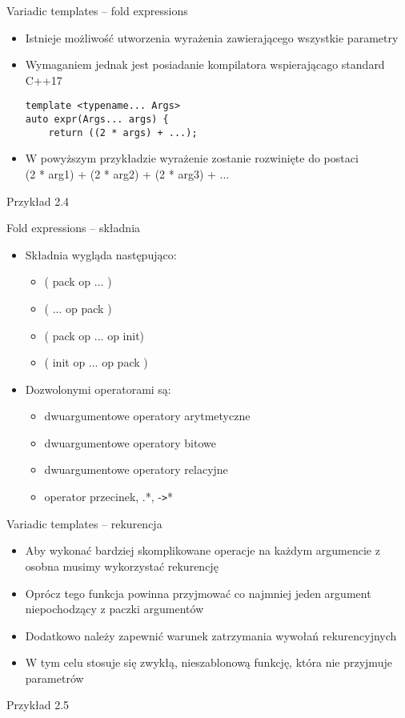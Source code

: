 \documentclass[11pt]{beamer}
\begin{document}
\begin{frame}[fragile]{Variadic templates -- fold expressions}
    \begin{itemize}
        \item Istnieje możliwość utworzenia wyrażenia zawierającego wszystkie parametry
        \item Wymaganiem jednak jest posiadanie kompilatora wspierającago standard C++17
    \begin{lstlisting}[frame=single]
template <typename... Args>
auto expr(Args... args) {
    return ((2 * args) + ...);
    \end{lstlisting}
        \item W powyższym przykładzie wyrażenie zostanie rozwinięte do postaci\\(2 * arg1) + (2 * arg2) + (2 * arg3) + ...
    \end{itemize} 
    \alert{Przykład 2.4}
\end{frame}

\begin{frame}[fragile]{Fold expressions -- składnia}
    \begin{itemize}
        \item Składnia wygląda następująco:
        \begin{itemize}
            \item ( pack op ... )
            \item ( ... op pack )
            \item ( pack op ... op init)
            \item ( init op ... op pack )
        \end{itemize}
        \item Dozwolonymi operatorami są:
        \begin{itemize}
            \item dwuargumentowe operatory arytmetyczne
            \item dwuargumentowe operatory bitowe
            \item dwuargumentowe operatory relacyjne
            \item operator przecinek, .*, -\verb|>|*
        \end{itemize}
    \end{itemize}
\end{frame}

\begin{frame}[fragile]{Variadic templates -- rekurencja}
    \begin{itemize}
        \item Aby wykonać bardziej skomplikowane operacje na każdym argumencie z osobna musimy wykorzystać rekurencję
        \item Oprócz tego funkcja powinna przyjmować co najmniej jeden argument niepochodzący z paczki argumentów
        \item Dodatkowo należy zapewnić warunek zatrzymania wywołań rekurencyjnych
        \item W tym celu stosuje się zwykłą, nieszablonową funkcję, która nie przyjmuje parametrów
    \end{itemize}
    \alert{Przykład 2.5}
\end{frame}
\end{document}
